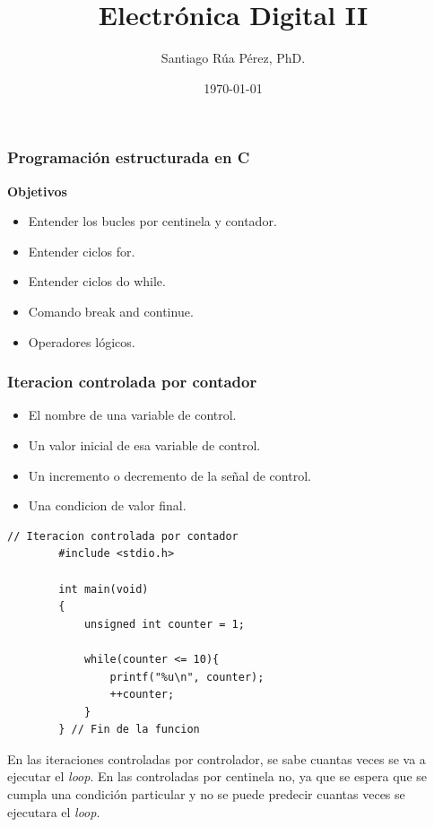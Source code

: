 \documentclass[10.5pt,scale=1.0,t,aspectratio=169,hyperref={pdfpagelabels=false}]{beamer}
\title{Electrónica Digital II}
\author{Santiago Rúa Pérez, PhD.}
\date{\today}
\begin{document}
\begin{frame}
	\titlepage
\end{frame}
\frame{
\begin{center}
\LARGE \textcolor{blue}{PROGRAMACIÓN ESTRUCTURADA EN C}
\end{center}
 
}

\begin{frame}
	\frametitle{Programación estructurada en C}
	{\bf Objetivos}
	\begin{itemize}
	\item Entender los bucles por centinela y contador.
	\item Entender ciclos for.
	\item Entender ciclos do while.
	\item Comando break and continue.
	\item Operadores lógicos.
	\end{itemize}
\end{frame}
\begin{frame}[fragile]
	\frametitle{Iteracion controlada por contador}
	\begin{itemize}
		\item El nombre de una variable de control.
		\item Un valor inicial de esa variable de control.
		\item Un incremento o decremento de la señal de control.
		\item Una condicion de valor final. 
	\end{itemize}

	\begin{lstlisting}[style=CStyle]
		// Iteracion controlada por contador
		#include <stdio.h>
		
		int main(void)
		{
			unsigned int counter = 1;
			
			while(counter <= 10){
				printf("%u\n", counter);
				++counter;
			}
		} // Fin de la funcion
	\end{lstlisting}

	En las iteraciones controladas por controlador, se sabe cuantas veces se va a ejecutar el \textit{loop}. En las controladas por centinela no, ya que se espera que se cumpla una condición particular y no se puede predecir cuantas veces se ejecutara el \textit{loop}.
\end{frame}
\end{document}
